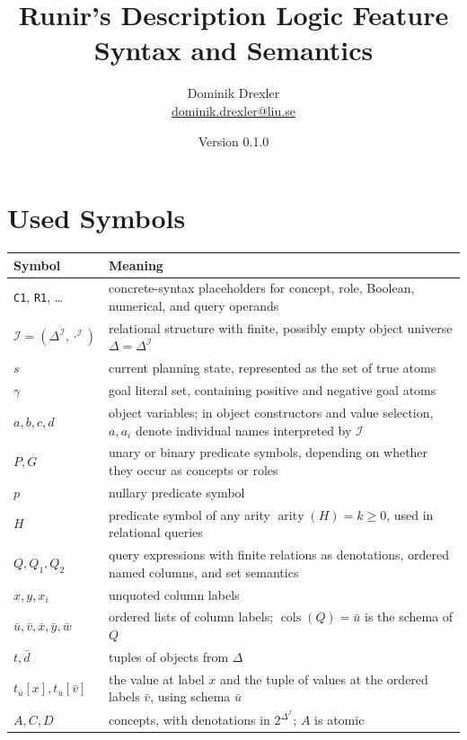 \documentclass[11pt]{article}
\title{Runir's Description Logic Feature Syntax and Semantics}
\author{Dominik Drexler\\\href{mailto:dominik.drexler@liu.se}{dominik.drexler@liu.se}}
\date{Version 0.1.0}
\newcommand{\I}{\mathcal{I}}
\newcommand{\DeltaI}{\Delta^{\I}}
\newenvironment{compacttable}
  {\begingroup\setlength{\tabcolsep}{3pt}}
  {\endgroup}
\begin{document}
\maketitle

\section{Used Symbols}

\begin{compacttable}
\begin{longtable}{>{\raggedright\arraybackslash}p{}
                  >{\raggedright\arraybackslash}p{}}
\toprule
Symbol & Meaning \\
\midrule
\endhead
\texttt{C1}, \texttt{R1}, \ldots & concrete-syntax placeholders for concept, role, Boolean, numerical, and query operands \\
$\I=(\DeltaI,\cdot^{\I})$ & relational structure with finite, possibly empty object universe $\Delta=\DeltaI$ \\
$s$ & current planning state, represented as the set of true atoms \\
$\gamma$ & goal literal set, containing positive and negative goal atoms \\
$a,b,c,d$ & object variables; in object constructors and value selection, $a,a_i$ denote individual names interpreted by $\I$ \\
$P,G$ & unary or binary predicate symbols, depending on whether they occur as concepts or roles \\
$p$ & nullary predicate symbol \\
$H$ & predicate symbol of any arity $\operatorname{arity}(H)=k\geq0$, used in relational queries \\
$Q,Q_1,Q_2$ & query expressions with finite relations as denotations, ordered named columns, and set semantics \\
$x,y,x_i$ & unquoted column labels \\
$\bar u,\bar v,\bar x,\bar y,\bar w$ & ordered lists of column labels; $\operatorname{cols}(Q)=\bar u$ is the schema of $Q$ \\
$t,\bar d$ & tuples of objects from $\Delta$ \\
$t_{\bar u}[x],t_{\bar u}[\bar v]$ & the value at label $x$ and the tuple of values at the ordered labels $\bar v$, using schema $\bar u$ \\
$A,C,D$ & concepts, with denotations in $2^{\DeltaI}$; $A$ is atomic \\

\end{longtable}
\end{compacttable}
\end{document}
